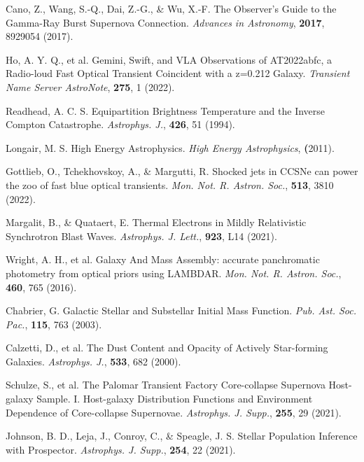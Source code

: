\documentclass{nature_plusfigure}
\newcommand{\mn}{{Mon. Not. R. Astron. Soc.}}
\newcommand{\mnras}{\mn}
\newcommand{\apj}{{Astrophys. J.}}
\newcommand{\apjl}{{Astrophys. J. Lett.}}
\newcommand{\apjs}{{Astrophys. J. Supp.}}
\newcommand{\pasp}{{Pub. Ast. Soc. Pac.}}
\begin{document}
\begin{methods}
\begin{thebibliography}{10}
 Cano, Z., Wang, S.-Q., Dai, Z.-G., \& Wu, X.-F. The Observer's Guide to the Gamma-Ray Burst Supernova Connection. \emph{Advances in Astronomy}, \textbf{2017}, 8929054 (2017). 


 Ho, A. Y. Q., et al. Gemini, Swift, and VLA Observations of AT2022abfc, a Radio-loud Fast Optical Transient Coincident with a z=0.212 Galaxy. \emph{Transient Name Server AstroNote}, \textbf{275}, 1 (2022). 


 Readhead, A. C. S. Equipartition Brightness Temperature and the Inverse Compton Catastrophe. \emph{\apj}, \textbf{426}, 51 (1994). 

 Longair, M. S. High Energy Astrophysics. \emph{High Energy Astrophysics}, \textbf (2011). 


 Gottlieb, O., Tchekhovskoy, A., \& Margutti, R. Shocked jets in CCSNe can power the zoo of fast blue optical transients. \emph{\mnras}, \textbf{513}, 3810 (2022). 


 Margalit, B., \& Quataert, E. Thermal Electrons in Mildly Relativistic Synchrotron Blast Waves. \emph{\apjl}, \textbf{923}, L14 (2021). 

 
 Wright, A. H., et al. Galaxy And Mass Assembly: accurate panchromatic photometry from optical priors using LAMBDAR. \emph{\mnras}, \textbf{460}, 765 (2016). 
 
 Chabrier, G. Galactic Stellar and Substellar Initial Mass Function. \emph{\pasp}, \textbf{115}, 763 (2003). 

 Calzetti, D., et al. The Dust Content and Opacity of Actively Star-forming Galaxies. \emph{\apj}, \textbf{533}, 682 (2000). 

 Schulze, S., et al. The Palomar Transient Factory Core-collapse Supernova Host-galaxy Sample. I. Host-galaxy Distribution Functions and Environment Dependence of Core-collapse Supernovae. \emph{\apjs}, \textbf{255}, 29 (2021). 

 Johnson, B. D., Leja, J., Conroy, C., \& Speagle, J. S. Stellar Population Inference with Prospector. \emph{\apjs}, \textbf{254}, 22 (2021). 


\end{thebibliography}
\end{methods}
\end{document}
